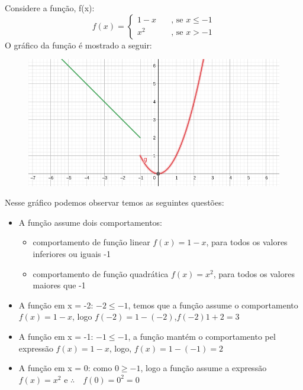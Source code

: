\begin{multicols*}{2}
    Considere a função, f(x):
    \[
    f(x) =
    \begin{cases}
        1-x &\quad\text{, se } x\leq -1\\
        x^2 &\quad\text{, se } x>-1
    \end{cases}    
    \]
    O gráfico da função é mostrado a seguir:
    \begin{figure}[H]
        \centering
        \includegraphics[scale=0.3]{assets/rafael/img5.png}
    \end{figure}
    Nesse gráfico podemos observar temos as seguintes questões:
    \begin{itemize}[wide, labelwidth=!, labelindent=0pt]
        \item A função assume dois comportamentos:
              \begin{itemize}
                  \item comportamento de função linear $f(x) = 1 - x$, para todos os valores 										inferiores ou iguais -1
                  \item comportamento de função quadrática $f(x) = x^2$, para todos os valores 									maiores que -1
              \end{itemize}
        \item A função em x = -2: $-2 \le -1$, temos que a função assume o comportamento
              $f(x) = 1 -x$, logo $f(-2) = 1 - (-2)$,$f(-2) 1 + 2 = 3$
        \item A função em x = -1: $-1 \le -1$, a função mantém o comportamento pel expressão
              $f(x) = 1 - x$, logo, $f(x) = 1 - (-1) = 2$
        \item A função em x = 0: como $0 \ge -1$, logo a função assume a expressão $f(x) = x^2$ e
              $\therefore \quad f(0) = 0^2 = 0$
    \end{itemize}


\end{multicols*}
